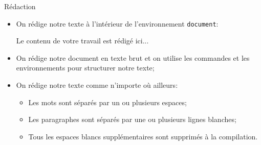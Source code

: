 \begin{frame}[fragile,c]{Rédaction}
	\begin{itemize}
		\item On rédige notre texte à l'intérieur de l'environnement \texttt{document}:
\begin{codesource}
	
		Le contenu de votre travail est rédigé ici...
	
\end{codesource}
		\item On rédige notre document en texte brut et on utilise les commandes et les environnements
		pour structurer notre texte;
		\item On rédige notre texte comme n'importe où ailleurs:
			\begin{itemize}
				\item Les mots sont séparés par un ou plusieurs espaces;
				\item Les paragraphes sont séparés par une ou plusieurs lignes blanches;
				\item Tous les espaces blancs supplémentaires sont supprimés à la compilation.
			\end{itemize}
	\end{itemize}
\end{frame}

